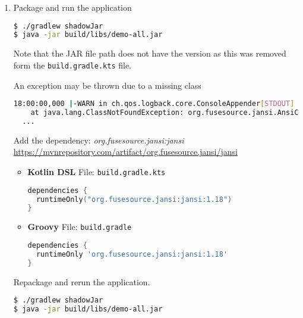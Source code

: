 \begin{enumerate}
\item Package and run the application

\begin{lstlisting}[language=bash]
$ ./gradlew shadowJar
$ java -jar build/libs/demo-all.jar
\end{lstlisting}

Note that the JAR file path does not have the version as this was removed form the \texttt{build.gradle.kts} file.

An exception may be thrown due to a missing class

\begin{lstlisting}[language=bash]
18:00:00,000 |-WARN in ch.qos.logback.core.ConsoleAppender[STDOUT] - Failed to create AnsiPrintStream. Falling back on the default stream. java.lang.ClassNotFoundException: org.fusesource.jansi.AnsiConsole
	at java.lang.ClassNotFoundException: org.fusesource.jansi.AnsiConsole
  ...
\end{lstlisting}

Add the dependency: \textit{org.fusesource.jansi:jansi}
\newline
{\footnotesize \url{https://mvnrepository.com/artifact/org.fusesource.jansi/jansi}}

\begin{itemize}

\item[] \textbf{Kotlin DSL}
\newline
File: \texttt{build.gradle.kts}

\begin{lstlisting}[language=Kotlin]
dependencies {
  runtimeOnly("org.fusesource.jansi:jansi:1.18")
}
\end{lstlisting}

\item[] \textbf{Groovy}
\newline
File: \texttt{build.gradle}

\begin{lstlisting}[language=Groovy]
dependencies {
  runtimeOnly 'org.fusesource.jansi:jansi:1.18'
}
\end{lstlisting}

\end{itemize}

Repackage and rerun the application.

\begin{lstlisting}[language=bash]
$ ./gradlew shadowJar
$ java -jar build/libs/demo-all.jar
\end{lstlisting}

\end{enumerate}
